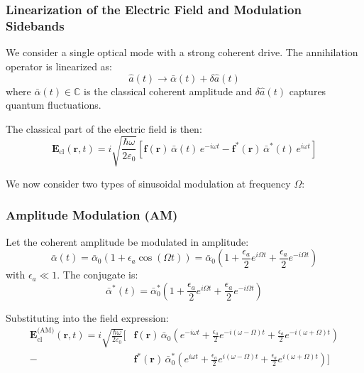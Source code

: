 \subsubsection*{Linearization of the Electric Field and Modulation Sidebands}

We consider a single optical mode with a strong coherent drive. The annihilation operator is linearized as:
\begin{equation}
    \hat{a}(t) \to \bar{\alpha}(t) + \delta \hat{a}(t)
\end{equation}
where $\bar{\alpha}(t) \in \mathbb{C}$ is the classical coherent amplitude and $\delta \hat{a}(t)$ captures quantum fluctuations.

The classical part of the electric field is then:
\begin{equation}
    \mathbf{E}_{\text{cl}}(\mathbf{r}, t) = i \sqrt{\frac{\hbar \omega}{2 \varepsilon_0}} \left[
    \mathbf{f}(\mathbf{r})\, \bar{\alpha}(t)\, e^{-i \omega t}
    - \mathbf{f}^*(\mathbf{r})\, \bar{\alpha}^*(t)\, e^{i \omega t}
    \right]
\end{equation}

We now consider two types of sinusoidal modulation at frequency $\Omega$:

\subsubsection*{Amplitude Modulation (AM)}

Let the coherent amplitude be modulated in amplitude:
\begin{equation}
    \bar{\alpha}(t) = \bar{\alpha}_0 \left(1 + \epsilon_a \cos(\Omega t)\right)
    = \bar{\alpha}_0 \left(1 + \frac{\epsilon_a}{2} e^{i\Omega t} + \frac{\epsilon_a}{2} e^{-i\Omega t} \right)
\end{equation}
with $\epsilon_a \ll 1$. The conjugate is:
\begin{equation}
    \bar{\alpha}^*(t) = \bar{\alpha}_0^* \left(1 + \frac{\epsilon_a}{2} e^{i\Omega t} + \frac{\epsilon_a}{2} e^{-i\Omega t} \right)
\end{equation}

Substituting into the field expression:
\begin{align}
    \mathbf{E}_{\text{cl}}^{\text{(AM)}}(\mathbf{r}, t) =
    i \sqrt{\frac{\hbar \omega}{2 \varepsilon_0}} \Big[
    &\mathbf{f}(\mathbf{r})\, \bar{\alpha}_0 \left( e^{-i\omega t} + \frac{\epsilon_a}{2} e^{-i(\omega - \Omega)t} + \frac{\epsilon_a}{2} e^{-i(\omega + \Omega)t} \right) \nonumber \\
    - &\mathbf{f}^*(\mathbf{r})\, \bar{\alpha}_0^* \left( e^{i\omega t} + \frac{\epsilon_a}{2} e^{i(\omega - \Omega)t} + \frac{\epsilon_a}{2} e^{i(\omega + \Omega)t} \right)
    \Big]
\end{align}


